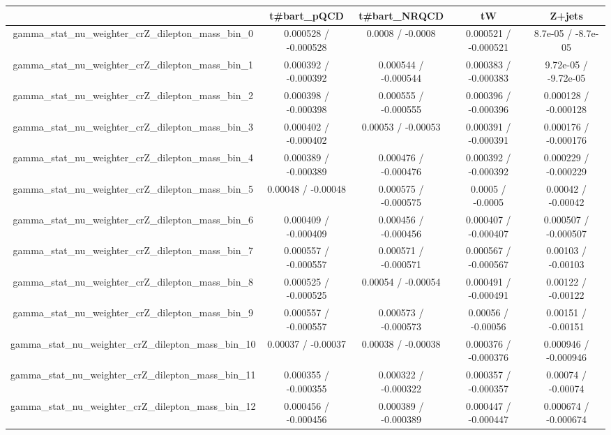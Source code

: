 \documentclass[10pt]{article}
\begin{document}
\begin{table}[htbp]
\begin{center}
\begin{tabular}{|c|c|c|c|c|}
\hline 
      & t#bar{t}_{pQCD}      & t#bar{t}_{NRQCD}      & tW      & Z+jets \\ 
\hline 
  gamma_stat_nu_weighter_crZ_dilepton_mass_bin_0 & 0.000528 / -0.000528 & 0.0008 / -0.0008 & 0.000521 / -0.000521 & 8.7e-05 / -8.7e-05 \\ 
  gamma_stat_nu_weighter_crZ_dilepton_mass_bin_1 & 0.000392 / -0.000392 & 0.000544 / -0.000544 & 0.000383 / -0.000383 & 9.72e-05 / -9.72e-05 \\ 
  gamma_stat_nu_weighter_crZ_dilepton_mass_bin_2 & 0.000398 / -0.000398 & 0.000555 / -0.000555 & 0.000396 / -0.000396 & 0.000128 / -0.000128 \\ 
  gamma_stat_nu_weighter_crZ_dilepton_mass_bin_3 & 0.000402 / -0.000402 & 0.00053 / -0.00053 & 0.000391 / -0.000391 & 0.000176 / -0.000176 \\ 
  gamma_stat_nu_weighter_crZ_dilepton_mass_bin_4 & 0.000389 / -0.000389 & 0.000476 / -0.000476 & 0.000392 / -0.000392 & 0.000229 / -0.000229 \\ 
  gamma_stat_nu_weighter_crZ_dilepton_mass_bin_5 & 0.00048 / -0.00048 & 0.000575 / -0.000575 & 0.0005 / -0.0005 & 0.00042 / -0.00042 \\ 
  gamma_stat_nu_weighter_crZ_dilepton_mass_bin_6 & 0.000409 / -0.000409 & 0.000456 / -0.000456 & 0.000407 / -0.000407 & 0.000507 / -0.000507 \\ 
  gamma_stat_nu_weighter_crZ_dilepton_mass_bin_7 & 0.000557 / -0.000557 & 0.000571 / -0.000571 & 0.000567 / -0.000567 & 0.00103 / -0.00103 \\ 
  gamma_stat_nu_weighter_crZ_dilepton_mass_bin_8 & 0.000525 / -0.000525 & 0.00054 / -0.00054 & 0.000491 / -0.000491 & 0.00122 / -0.00122 \\ 
  gamma_stat_nu_weighter_crZ_dilepton_mass_bin_9 & 0.000557 / -0.000557 & 0.000573 / -0.000573 & 0.00056 / -0.00056 & 0.00151 / -0.00151 \\ 
  gamma_stat_nu_weighter_crZ_dilepton_mass_bin_10 & 0.00037 / -0.00037 & 0.00038 / -0.00038 & 0.000376 / -0.000376 & 0.000946 / -0.000946 \\ 
  gamma_stat_nu_weighter_crZ_dilepton_mass_bin_11 & 0.000355 / -0.000355 & 0.000322 / -0.000322 & 0.000357 / -0.000357 & 0.00074 / -0.00074 \\ 
  gamma_stat_nu_weighter_crZ_dilepton_mass_bin_12 & 0.000456 / -0.000456 & 0.000389 / -0.000389 & 0.000447 / -0.000447 & 0.000674 / -0.000674 \\ 

\end{tabular}
\end{center}
\end{table}
\end{document}
